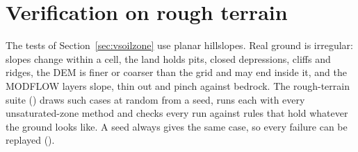 \section{Verification on rough terrain}\label{sec:vrough}
The tests of Section~\ref{sec:vsoilzone} use planar hillslopes. Real ground is irregular: slopes change within a cell,
the land holds pits, closed depressions, cliffs and ridges, the DEM is finer or coarser than the grid and may end inside
it, and the MODFLOW layers slope, thin out and pinch against bedrock. The rough-terrain suite
() draws such cases at random from a seed, runs each with every
unsaturated-zone method and checks every run against rules that hold whatever the ground looks like. A seed always gives
the same case, so every failure can be replayed ().

